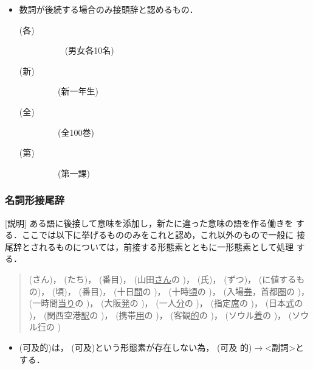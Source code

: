\begin{itemize}       
\item 数詞が後続する場合のみ接頭辞と認めるもの．
    \begin{description}
    \item[
(各)] 
\ 
\ 
\ 
 (男女各10名)
    \item[
(新)] 
\ 
\ 
 (新一年生)
    \item[
(全)] 
\ 
\ 
 (全100巻)
    \item[
(第)] 
\ 
\ 
 (第一課)
    \end{description}

\end{itemize}

        
\subsubsection{名詞形接尾辞}        
[説明] ある語に後接して意味を添加し，新たに違った意味の語を作る働きを
する．ここでは以下に挙げるもののみをこれと認め，これ以外のもので一般に
接尾辞とされるものについては，前接する形態素とともに一形態素として処理
する．

\begin{quote}      
(さん)，
(たち)，
(番目)，
(山田\underline{さん}の
)，
(氏)，
(ずつ)，
(に値するもの)，
(頃)，
(番目)，
 (十日\underline{間}の
)，
 (十時\underline{頃}の
)，
 (入場\underline{券}，首都\underline{圏}の
)，
 (一時間\underline{当り}の
)，
 (大阪\underline{発}の
)，
 (一人\underline{分}の
)，
 (指定\underline{席}の
)，
 (日本\underline{式}の
)，
 (関西空港\underline{駅}の
)，
 (携帯\underline{用}の
)，
 (客観\underline{的}の
)，
 (ソウル\underline{着}の
)，
 (ソウル\underline{行}の
)
\end{quote}


\begin{itemize}
\item 
{}
(可及的)は，
(可及)という形態素が存在しない為，
(可及
的)$\longrightarrow$<副詞>とする．
\end{itemize}

